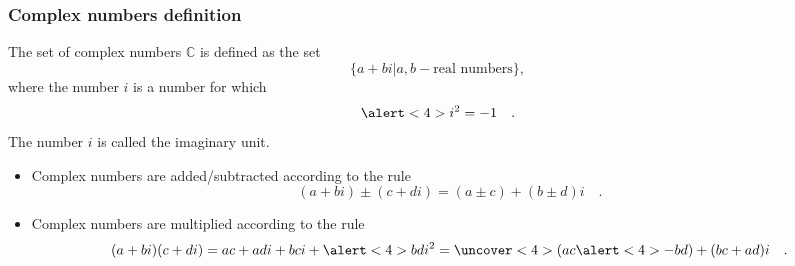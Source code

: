 \begin{frame}
\frametitle{Complex numbers definition}
\begin{definition}The set of complex numbers $\mathbb C$ is defined as the set
\[
\{a+  b i  | a,b-\text{real~numbers}\},
\]
where the number $i$ is a number for which 
\[
\alert<4>{i^2=-1}\quad .
\]
The number $i$ is called the imaginary unit.
\end{definition}
\begin{itemize}
\item<2-> Complex numbers are added/subtracted according to the rule
\[
(a+b i)\pm(c+d i)= (a\pm c) + (b\pm d)i\quad .
\]
\item<3-> Complex numbers are multiplied according to the rule
\[
(a+b i)(c+d i)= a c + a d i+ b ci + \alert<4>{bd i^2}= \uncover<4>{(ac \alert<4>{- bd}) + (bc+ad)i}  \quad .
\]
\end{itemize}

\end{frame}